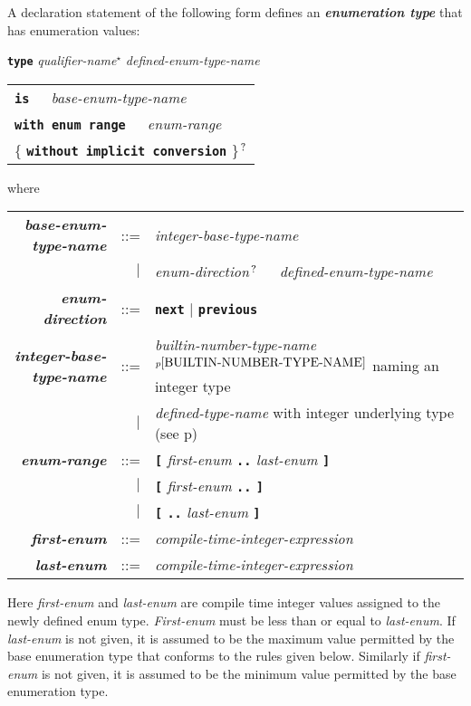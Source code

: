 \documentclass[12pt]{article}
\makeatletter
\newcommand{\TT}[1]{{\tt \bfseries #1}}
\newcommand{\key}[1]{{\bf \em #1}\index{#1}}
\newcommand{\emkey}[1]{{\bf \em #1}\index{#1@{\em #1}}}
\newcommand{\pagref}[1]{p\pageref{#1}}
\newcommand{\STAR}{{\Large $^\star$}}
\newcommand{\QMARK}{{$^{\,\mbox{\footnotesize ?}}$}}
\makeatother
\begin{document}
A declaration statement of the following form defines an \key{enumeration type}
that has enumeration values:
\begin{center}
\TT{type} {\em qualifier-name}\STAR{} {\em defined-enum-type-name}
    \begin{tabular}[t]{l}
    \TT{is}~~~{\em base-enum-type-name} \\
    \TT{with enum range}~~~{\em enum-range} \\
    \{ \TT{without implicit conversion} \}\QMARK \\
    \end{tabular}
\end{center}
where
\begin{center}
\begin{tabular}{rrl}
\emkey{base-enum-type-name}
    & ::= & {\em integer-base-type-name} \\
    & $|$ & {\em enum-direction}\QMARK{}~~~{\em defined-enum-type-name} \\
\emkey{enum-direction}
    & ::= & \TT{next} $|$ \TT{previous} \\
\emkey{integer-base-type-name}
    & ::= & {\em builtin-number-type-name}%
            \,$^{\pagref{BUILTIN-NUMBER-TYPE-NAME}}$ naming an integer type \\
    & $|$ & {\em defined-type-name} with integer underlying type
            (see \pagref{UNDERLYING-TYPE}) \\
\emkey{enum-range}
    & ::= & \TT{[} {\em first-enum} \TT{..} {\em last-enum} \TT{]} \\
    & $|$ & \TT{[} {\em first-enum} \TT{..} \TT{]} \\
    & $|$ & \TT{[} \TT{..} {\em last-enum} \TT{]} \\
\emkey{first-enum}
    & ::= & {\em compile-time-integer-expression} \\
\emkey{last-enum}
    & ::= & {\em compile-time-integer-expression} \\
\end{tabular}
\end{center}

Here {\em first-enum} and {\em last-enum} are compile time integer
values assigned to the newly defined enum type.
{\em First-enum} must be less than or equal to {\em last-enum}.
If {\em last-enum} is not given, it is assumed to be the maximum
value permitted by the base enumeration type that conforms to the
rules given below.
Similarly if {\em first-enum} is not given, it is assumed to be the minimum
value permitted by the base enumeration type.
\end{document}
